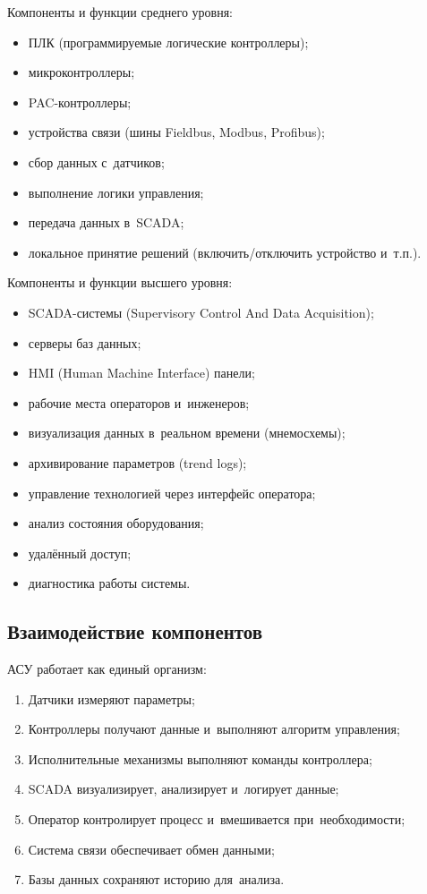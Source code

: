 \documentclass{ou}
\begin{document}
Компоненты и функции среднего уровня: 
\begin{itemize}[label=-, leftmargin=0em, itemindent=3.35em, nosep]
\item ПЛК (программируемые логические контроллеры);
\item микроконтроллеры;
\item PAC-контроллеры;
\item устройства связи (шины Fieldbus, Modbus, Profibus);
\item сбор данных с~датчиков;
\item выполнение логики управления;
\item передача данных в~SCADA;
\item локальное принятие решений (включить/отключить устройство и~т.п.).
\end{itemize}

Компоненты и функции высшего уровня: 
\begin{itemize}[label=-, leftmargin=0em, itemindent=3.35em, nosep]
\item SCADA-системы (Supervisory Control And Data Acquisition);
\item серверы баз данных;
\item HMI (Human Machine Interface) панели;
\item рабочие места операторов и~инженеров;
\item визуализация данных в~реальном времени (мнемосхемы);
\item архивирование параметров (trend logs);
\item управление технологией через интерфейс оператора;
\item анализ состояния оборудования;
\item удалённый доступ;
\item диагностика работы системы.
\end{itemize}
\subsection{Взаимодействие компонентов}
АСУ работает как единый организм:
\begin{enumerate}[leftmargin=0em, itemindent=3.75em, nosep, label=\arabic*)]
\item Датчики измеряют параметры;
\item Контроллеры получают данные и~выполняют алгоритм управления;
\item Исполнительные механизмы выполняют команды контроллера;
\item SCADA визуализирует, анализирует и~логирует данные;
\item Оператор контролирует процесс и~вмешивается при~необходимости;
\item Система связи обеспечивает обмен данными;
\item Базы данных сохраняют историю для~анализа.
\end{enumerate}
\end{document}
